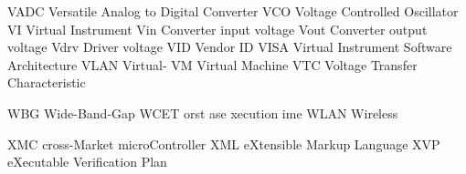 		{VADC}		{Versatile Analog to Digital Converter}
		{VCO}		{Voltage Controlled Oscillator}
			{VI}		{Virtual Instrument}
		{Vin}		{Converter input voltage}
		{Vout}		{Converter output voltage}
		{Vdrv}		{Driver voltage}
		{VID}		{Vendor ID}
		{VISA}		{Virtual Instrument Software Architecture}
		{VLAN}		{Virtual-{}}
			{VM}		{Virtual Machine}
		{VTC}		{Voltage Transfer Characteristic}

		{WBG}		{Wide-Band-Gap}
		{WCET}		{orst ase xecution ime}
		{WLAN}		{Wireless {}}

		{XMC}		{cross-Market microController}
		{XML}		{eXtensible Markup Language}
		{XVP}		{eXecutable Verification Plan}


